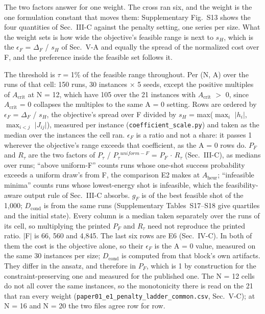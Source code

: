 \documentclass[journal]{IEEEtran}
\begin{document}
The two factors answer for one weight. The cross ran six, and the weight is the one formulation constant that moves them: Supplementary Fig.~S13 shows the four quantities of Sec.~III-C against the penalty setting, one series per size. What the weight sets is how wide the objective's feasible range is next to $s_{H}$, which is the $\epsilon_{F}$ = $\Delta_{F}$ / $s_{H}$ of Sec.~V-A and equally the spread of the normalized cost over F, and the preference inside the feasible set follows it.


The threshold is $\tau$ = 1\% of the feasible range throughout. Per (N, A) over the runs of that cell: 150 runs, 30 instances $\times$ 5 seeds, except the positive multiples of $A_{\mathrm{crit}}$ at N = 12, which have 105 over the 21 instances with $A_{\mathrm{crit}}$ $>$ 0, since $A_{\mathrm{crit}}$ = 0 collapses the multiples to the same A = 0 setting. Rows are ordered by $\epsilon_{F}$ = $\Delta_{F}$ / $s_{H}$, the objective's spread over F divided by $s_{H}$ = max($\max_{i}$ $|$$h_{i}$$|$, $\max_{i<j}$ $|$$J_{ij}$$|$), measured per instance (\texttt{coefficient\_scale.py}) and taken as the median over the instances the cell ran. $\epsilon_{F}$ is a ratio and not a share: it passes 1 wherever the objective's range exceeds that coefficient, as the A = 0 rows do. $P_{F}$ and $R_{\tau}$ are the two factors of $P_{\tau}$ / $P_{\tau}$$^{uniform-F}$ = $P_{F}$ $\cdot$ $R_{\tau}$ (Sec.~III-C), as medians over runs; ``above uniform-F'' counts runs whose one-shot success probability exceeds a uniform draw's from F, the comparison E2 makes at $A_{\mathrm{heur}}$; ``infeasible minima'' counts runs whose lowest-energy shot is infeasible, which the feasibility-aware output rule of Sec.~III-C absorbs. $g_{F}$ is of the best feasible shot of the 1,000; $D_{\mathrm{cond}}$ is from the same runs (Supplementary Tables~S17--S18 give quartiles and the initial state). Every column is a median taken separately over the runs of its cell, so multiplying the printed $P_{F}$ and $R_{\tau}$ need not reproduce the printed ratio. $|$F$|$ is 66, 560 and 4,845. The last six rows are E6 (Sec.~IV-C). In both of them the cost is the objective alone, so their $\epsilon_{F}$ is the A = 0 value, measured on the same 30 instances per size; $D_{\mathrm{cond}}$ is computed from that block's own artifacts. They differ in the ansatz, and therefore in $P_{F}$, which is 1 by construction for the constraint-preserving one and measured for the published one. The N = 12 cells do not all cover the same instances, so the monotonicity there is read on the 21 that ran every weight (\texttt{paper01\_e1\_penalty\_ladder\_common.csv}, Sec.~V-C); at N = 16 and N = 20 the two files agree row for row.
\end{document}
